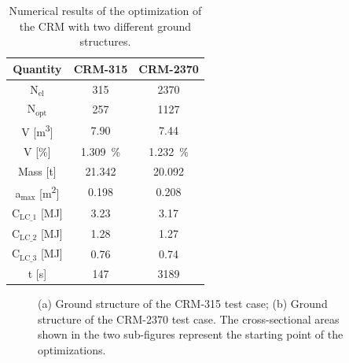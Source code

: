 \begin{table}
    \small
    \centering
    \begin{tabular}{ccc}
    \toprule
    \textbf{Quantity} & \textbf{CRM-315} & \textbf{CRM-2370} \\ \midrule
    N$_{\text{el}}$          & 315               & 2370               \\
    N$_{\text{opt}}$           & 257                  &  1127              \\
    V [\unit{\meter^3}]             &  7.90                 &  7.44             \\
    V [\unit{\%}]             &   \qty{1.309}{\%}                & \qty{1.232}{\%}               \\
    Mass [\unit{\tonne}]               &   21.342                & 20.092     \\
    a$_{\text{max}}$ [\unit{\meter^2}]           &  0.198                 & 0.208              \\
    C$_\text{LC\_1}$ [\unit{\mega \joule}]                &  3.23                 &  3.17              \\
    C$_\text{LC\_2}$ [\unit{\mega \joule}]                &   1.28                &  1.27              \\
    C$_\text{LC\_3}$ [\unit{\mega \joule}]                &   0.76                &  0.74              \\
    t [\unit{\second}]                & 147                  & 3189   \\ \bottomrule            
    \end{tabular}
    \caption{Numerical results of the optimization of the CRM with two different ground structures.}
    \label{tab:wing-res}
    \end{table}
    
    \begin{figure}
        \centering
        \bigskip
        \caption{(a) Ground structure of the CRM-315 test case; (b) Ground structure of the CRM-2370 test case. The cross-sectional areas shown in the two sub-figures represent the starting point of the optimizations.}
        \label{fig:07_crm}
    \end{figure}
    
